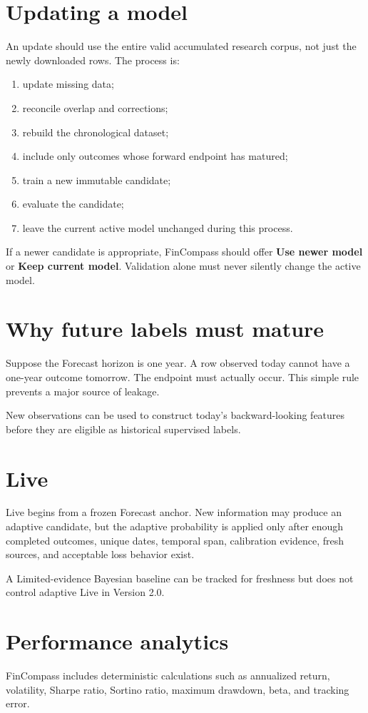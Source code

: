 \documentclass[11pt]{article}
\begin{document}
\section{Updating a model}
An update should use the entire valid accumulated research corpus, not just the newly downloaded rows. The process is:
\begin{enumerate}
\item update missing data;
\item reconcile overlap and corrections;
\item rebuild the chronological dataset;
\item include only outcomes whose forward endpoint has matured;
\item train a new immutable candidate;
\item evaluate the candidate;
\item leave the current active model unchanged during this process.
\end{enumerate}

If a newer candidate is appropriate, FinCompass should offer \textbf{Use newer model} or \textbf{Keep current model}. Validation alone must never silently change the active model.

\section{Why future labels must mature}
Suppose the Forecast horizon is one year. A row observed today cannot have a one-year outcome tomorrow. The endpoint must actually occur. This simple rule prevents a major source of leakage.

New observations can be used to construct today's backward-looking features before they are eligible as historical supervised labels.

\section{Live}
Live begins from a frozen Forecast anchor. New information may produce an adaptive candidate, but the adaptive probability is applied only after enough completed outcomes, unique dates, temporal span, calibration evidence, fresh sources, and acceptable loss behavior exist.

A Limited-evidence Bayesian baseline can be tracked for freshness but does not control adaptive Live in Version 2.0.

\section{Performance analytics}
FinCompass includes deterministic calculations such as annualized return, volatility, Sharpe ratio, Sortino ratio, maximum drawdown, beta, and tracking error.
\end{document}
